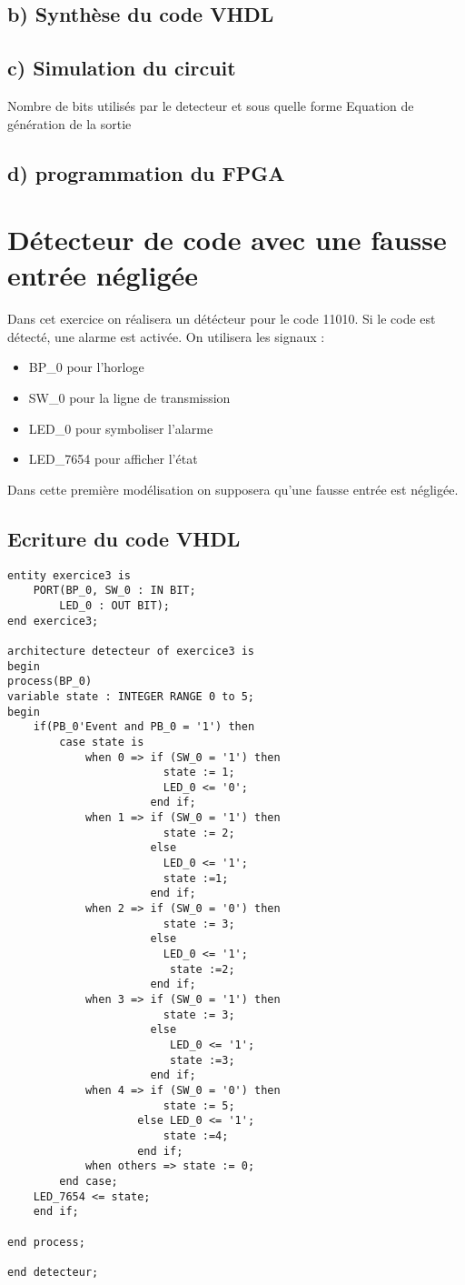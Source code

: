 \documentclass[11pt]{report}
\begin{document}
\subsection{ b) Synthèse du code VHDL }
 
  \subsection{ c) Simulation du circuit}
  
  Nombre de bits utilisés par le detecteur et sous quelle forme
  Equation de génération de la sortie
  
  
   \subsection{ d) programmation du FPGA}


\section{Détecteur de code avec une fausse entrée négligée}

Dans cet exercice on réalisera un détécteur pour le code 11010. Si le code est détecté, une alarme est activée. On utilisera les signaux :
\begin{itemize}
	\item BP\_0 pour l'horloge
	\item SW\_0 pour la ligne de transmission
	\item LED\_0 pour symboliser l'alarme
	\item LED\_7654 pour afficher l'état

\end{itemize}

Dans cette première modélisation on supposera qu'une fausse entrée est négligée. 

\subsection{Ecriture du code VHDL}

\begin{lstlisting}
entity exercice3 is
	PORT(BP_0, SW_0 : IN BIT;
		LED_0 : OUT BIT);
end exercice3;

architecture detecteur of exercice3 is
begin
process(BP_0)
variable state : INTEGER RANGE 0 to 5;
begin
	if(PB_0'Event and PB_0 = '1') then
		case state is
			when 0 => if (SW_0 = '1') then 
						state := 1; 
						LED_0 <= '0'; 
					  end if;
			when 1 => if (SW_0 = '1') then 
						state := 2; 
					  else 
					  	LED_0 <= '1'; 
						state :=1; 
					  end if;
			when 2 => if (SW_0 = '0') then 
						state := 3; 
					  else 
					  	LED_0 <= '1';
					  	 state :=2; 
					  end if;
			when 3 => if (SW_0 = '1') then 
						state := 3; 
					  else
					  	 LED_0 <= '1'; 
					  	 state :=3; 
					  end if;
			when 4 => if (SW_0 = '0') then 
						state := 5; 
					else LED_0 <= '1'; 
						state :=4;
					end if;
			when others => state := 0;
		end case;
	LED_7654 <= state;
	end if;

end process;

end detecteur;

\end{lstlisting}
\end{document}
